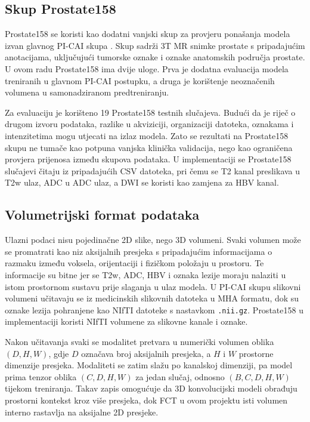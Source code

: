 \documentclass[a4paper,12pt,oneside]{article}
\begin{document}
\subsection{Skup Prostate158}

Prostate158 se koristi kao dodatni vanjski skup za provjeru ponašanja modela izvan glavnog PI-CAI skupa \cite{prostate158_main,prostate158_dib}. Skup sadrži 3T MR snimke prostate s pripadajućim anotacijama, uključujući tumorske oznake i oznake anatomskih područja prostate. U ovom radu Prostate158 ima dvije uloge. Prva je dodatna evaluacija modela treniranih u glavnom PI-CAI postupku, a druga je korištenje neoznačenih volumena u samonadziranom predtreniranju.

Za evaluaciju je korišteno 19 Prostate158 testnih slučajeva. Budući da je riječ o drugom izvoru podataka, razlike u akviziciji, organizaciji datoteka, oznakama i intenzitetima mogu utjecati na izlaz modela. Zato se rezultati na Prostate158 skupu ne tumače kao potpuna vanjska klinička validacija, nego kao ograničena provjera prijenosa između skupova podataka. U implementaciji se Prostate158 slučajevi čitaju iz pripadajućih CSV datoteka, pri čemu se T2 kanal preslikava u T2w ulaz, ADC u ADC ulaz, a DWI se koristi kao zamjena za HBV kanal.

\subsection{Volumetrijski format podataka}

Ulazni podaci nisu pojedinačne 2D slike, nego 3D volumeni. Svaki volumen može se promatrati kao niz aksijalnih presjeka s pripadajućim informacijama o razmaku između voksela, orijentaciji i fizičkom položaju u prostoru. Te informacije su bitne jer se T2w, ADC, HBV i oznaka lezije moraju nalaziti u istom prostornom sustavu prije slaganja u ulaz modela. U PI-CAI skupu slikovni volumeni učitavaju se iz medicinskih slikovnih datoteka u MHA formatu, dok su oznake lezija pohranjene kao NIfTI datoteke s nastavkom \texttt{.nii.gz}. Prostate158 u implementaciji koristi NIfTI volumene za slikovne kanale i oznake.

Nakon učitavanja svaki se modalitet pretvara u numerički volumen oblika $(D, H, W)$, gdje $D$ označava broj aksijalnih presjeka, a $H$ i $W$ prostorne dimenzije presjeka. Modaliteti se zatim slažu po kanalskoj dimenziji, pa model prima tenzor oblika $(C, D, H, W)$ za jedan slučaj, odnosno $(B, C, D, H, W)$ tijekom treniranja. Takav zapis omogućuje da 3D konvolucijski modeli obrađuju prostorni kontekst kroz više presjeka, dok FCT u ovom projektu isti volumen interno rastavlja na aksijalne 2D presjeke.
\end{document}
